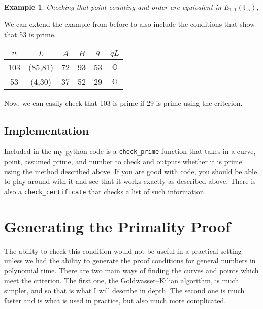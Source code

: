 \documentclass[]{article}
\newtheorem{benexample}{Example}
\newcommand{\OS}{\mathbb{O}}
\newcommand{\F}{\mathbb{F}}
\begin{document}

\begin{mdframed}[linewidth=2pt]
	\noindent \begin{benexample}
		Checking that point counting and order are equivalent in $E_{1,1}(\F_5)$,
	\end{benexample}

	We can extend the example from before to also include the conditions that show that 53 is prime.

	\begin{tabular}{| c | c | c | c | c | c |}
		\hline
		$n$ & $L$     & $A$ & $B$ & $q$ & $qL$ \\ \hline \hline
		103 & (85,81) & 72 &  93 &  53 &  $\OS$ \\ \hline
		53 & (4,30)   & 37 & 52 & 29  & $\OS$ \\ \hline
	\end{tabular}

	\noindent Now, we can easily check that 103 is prime if 29 is prime using the criterion.

\end{mdframed}

\subsection{Implementation}

Included in the my python code is a \texttt{check\_prime} function that takes in a curve, point, assumed prime, and number to check and outputs whether it is prime using the method described above. If you are good with code, you should be able to play around with it and see that it works exactly as described above. There is also a \texttt{check\_certificate} that checks a list of such information.

\section{Generating the Primality Proof}

The ability to check this condition would not be useful in a practical setting unless we had the ability to generate the proof conditions for general numbers in polynomial time. There are two main ways of finding the curves and points which meet the criterion. The first one, the Goldwasser--Kilian algorithm, is much simpler, and so that is what I will describe in depth. The second one is much faster and is what is used in practice, but also much more complicated.
\end{document}
